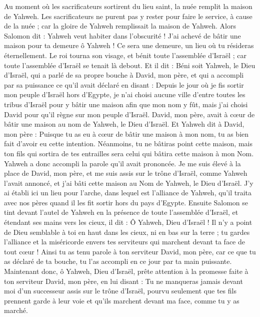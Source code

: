 \begin{multicols}{2}
Au moment où les sacrificateurs sortirent du lieu saint, la nuée remplit la maison de Yahweh.
Les sacrificateurs ne purent pas y rester pour faire le service, à cause de la nuée ; car la gloire de Yahweh remplissait la maison de Yahweh.
Alors Salomon dit : Yahweh veut habiter dans l'obscurité !
J'ai achevé de bâtir une maison pour ta demeure ô Yahweh ! Ce sera une demeure, un lieu où tu résideras éternellement.
Le roi tourna son visage, et bénit toute l'assemblée d'Israël ; car toute l'assemblée d'Israël se tenait là debout.
Et il dit : Béni soit Yahweh, le Dieu d'Israël, qui a parlé de sa propre bouche à David, mon père, et qui a accompli par sa puissance ce qu’il avait déclaré en disant :
Depuis le jour où je fis sortir mon peuple d'Israël hors d'Egypte, je n'ai choisi aucune ville d'entre toutes les tribus d'Israël pour y bâtir une maison afin que mon nom y fût, mais j'ai choisi David pour qu’il règne sur mon peuple d'Israël.
David, mon père, avait à cœur de bâtir une maison au nom de Yahweh, le Dieu d'Israël.
Et Yahweh dit à David, mon père : Puisque tu as eu à cœur de bâtir une maison à mon nom, tu as bien fait d’avoir eu cette intention.
Néanmoins, tu ne bâtiras point cette maison, mais ton fils qui sortira de tes entrailles sera celui qui bâtira cette maison à mon Nom.
Yahweh a donc accompli la parole qu'il avait prononcée. Je me suis élevé à la place de David, mon père, et me suis assis sur le trône d'Israël, comme Yahweh l’avait annoncé, et j'ai bâti cette maison au Nom de Yahweh, le Dieu d'Israël.
J'y ai établi ici un lieu pour l'arche, dans lequel est l'alliance de Yahweh, qu'il traita avec nos pères quand il les fit sortir hors du pays d'Egypte.
Ensuite Salomon se tint devant l'autel de Yahweh en la présence de toute l'assemblée d'Israël, et étendant ses mains vers les cieux,
il dit : Ô Yahweh, Dieu d'Israël ! Il n'y a point de Dieu semblable à toi en haut dans les cieux, ni en bas sur la terre ; tu gardes l'alliance et la miséricorde envers tes serviteurs qui marchent devant ta face de tout cœur !
Ainsi tu as tenu parole à ton serviteur David, mon père, car ce que tu as déclaré de ta bouche, tu l'as accompli en ce jour par ta main puissante.
Maintenant donc, ô Yahweh, Dieu d'Israël, prête attention à la promesse faite à ton serviteur David, mon père, en lui disant : Tu ne manqueras jamais devant moi d’un successeur assis sur le trône d'Israël, pourvu seulement que tes fils prennent garde à leur voie et qu’ils marchent devant ma face, comme tu y as marché.

\end{multicols}
